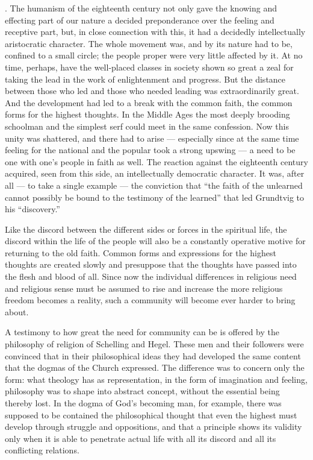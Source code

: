 \documentclass[12pt,a4paper]{article}
\begin{document}
\medskip
{}. The humanism of the eighteenth century not only gave the knowing
and effecting part of our nature a decided preponderance over the feeling and
receptive part, but, in close connection with this, it had a decidedly
intellectually aristocratic character. The whole movement was, and by its
nature had to be, confined to a small circle; the people proper were very
little affected by it. At no time, perhaps, have the well-placed classes in
society shown so great a zeal for taking the lead in the work of enlightenment
and progress. But the distance between those who led and those who needed
leading was extraordinarily great. And the development had led to a break with
the common faith, the common forms for the highest thoughts. In the Middle
Ages the most deeply brooding schoolman and the simplest serf could meet in
the same confession. Now this unity was shattered, and there had to arise ---
especially since at the same time feeling for the national and the popular took
a strong upswing --- a need to be one with one's people in faith as well. The
reaction against the eighteenth century acquired, seen from this side, an
intellectually democratic character. It was, after all --- to take a single
example --- the conviction that ``the faith of the unlearned cannot possibly be
bound to the testimony of the learned'' that led Grundtvig to his
``discovery.''

Like the discord between the different sides or forces in the spiritual life,
the discord within the life of the people will also be a constantly operative
motive for returning to the old faith. Common forms and expressions for the
highest thoughts are created slowly and presuppose that the thoughts have
passed into the flesh and blood of all. Since now the individual differences
in religious need and religious sense must be assumed to rise and increase the
more religious freedom becomes a reality, such a community will become ever
harder to bring about.

A testimony to how great the need for community can be is offered by the
philosophy of religion of Schelling and Hegel. These men and their followers
were convinced that in their philosophical ideas they had developed the same
content that the dogmas of the Church expressed. The difference was to concern
only the form: what theology has as representation, in the form of imagination
and feeling, philosophy was to shape into abstract concept, without the
essential being thereby lost. In the dogma of God's becoming man, for example,
there was supposed to be contained the philosophical thought that even the
highest must develop through struggle and oppositions, and that a principle
shows its validity only when it is able to penetrate actual life with all its
discord and all its conflicting relations.
\end{document}
